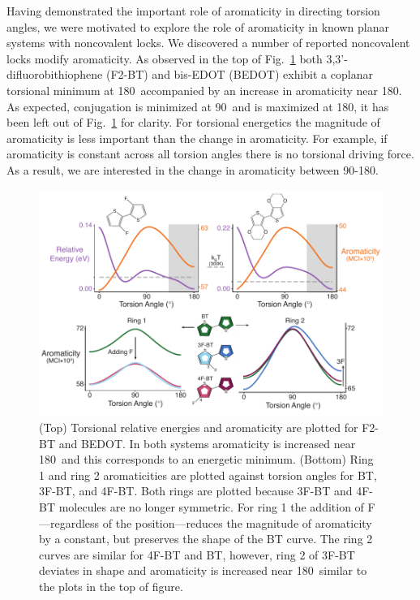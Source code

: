 Having demonstrated the important role of aromaticity in directing torsion angles, we were motivated to explore the role of aromaticity in known planar systems with noncovalent locks. We discovered a number of reported noncovalent locks modify aromaticity. As observed in the top of Fig.~\ref{fig:a_mod} both  3,3'-difluorobithiophene (F2-BT) and bis-EDOT (BEDOT) exhibit a coplanar torsional minimum at 180\textdegree \ accompanied by an increase in aromaticity near 180\textdegree. As expected, conjugation is minimized at 90\textdegree \ and is maximized at 180\textdegree, it has been left out of Fig.~\ref{fig:a_mod} for clarity. For torsional energetics the magnitude of aromaticity is less important than the change in aromaticity. For example, if aromaticity is constant across all torsion angles there is no torsional driving force. As a result, we are interested in the change in aromaticity between 90-180\textdegree.

\begin{figure}[hbt!]
    \centering
    \includegraphics{figures/chap3/fig2_d7.pdf}
    \caption[Modification of Aromaticity in F2-BT, BEDOT, and Other Fluorinated Thiophenes]{(Top) Torsional relative energies and aromaticity are plotted for F2-BT and BEDOT. In both systems aromaticity is increased near 180\textdegree \ and this corresponds to an energetic minimum. (Bottom) Ring 1 and ring 2 aromaticities are plotted against torsion angles for BT, 3F-BT, and 4F-BT. Both rings are plotted because 3F-BT and 4F-BT molecules are no longer symmetric. For ring 1 the addition of F---regardless of the position---reduces the magnitude of aromaticity by a constant, but preserves the shape of the BT curve. The ring 2 curves are similar for 4F-BT and BT, however, ring 2 of 3F-BT deviates in shape and aromaticity is increased near 180\textdegree \ similar to the plots in the top of figure.}
    \label{fig:a_mod}
\end{figure}

